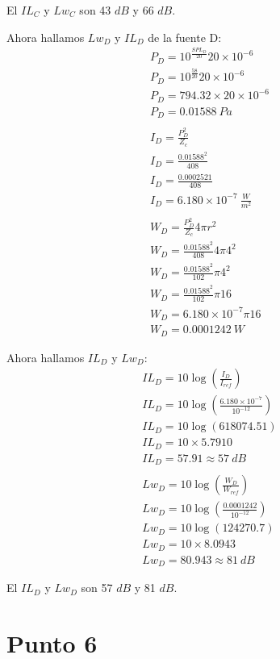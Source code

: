 \documentclass{article}
\begin{document}
El $IL_C$ y $Lw_C$ son 43 $dB$ y 66 $dB$.

Ahora hallamos $Lw_D$ y $IL_D$ de la fuente D:
\begin{gather*}
    P_D = 10^{\frac{SPL_D}{20}} 20 \times 10^{-6}\\
    P_D = 10^{\frac{58}{20}} 20 \times 10^{-6}\\
    P_D = 794.32 \times 20 \times 10^{-6}\\
    P_D = 0.01588\ Pa\\\\
    I_D = \frac{P_D^2}{Z_c}\\
    I_D = \frac{0.01588^2}{408}\\
    I_D = \frac{0.0002521}{408}\\
    I_D = 6.180 \times 10^{-7}\ \frac{W}{m^2}\\\\
    W_D = \frac{P_D^2}{Z_c} 4\pi r^2\\
    W_D = \frac{0.01588^2}{408} 4\pi 4^2\\
    W_D = \frac{0.01588^2}{102} \pi 4^2\\
    W_D = \frac{0.01588^2}{102} \pi 16\\
    W_D = 6.180 \times 10^{-7} \pi 16\\
    W_D = 0.0001242\ W
\end{gather*}

Ahora hallamos $IL_D$ y $Lw_D$:
\begin{gather*}
    IL_D = 10 \log(\frac{I_D}{I_{ref}})\\
    IL_D = 10 \log(\frac{6.180 \times 10^{-7}}{10^{-12}})\\
    IL_D = 10 \log(618074.51)\\
    IL_D = 10 \times 5.7910\\
    IL_D = 57.91 \approx 57\ dB\\\\
    Lw_D = 10 \log(\frac{W_D}{W_{ref}})\\
    Lw_D = 10 \log(\frac{0.0001242}{10^{-12}})\\
    Lw_D = 10 \log(124270.7)\\
    Lw_D = 10 \times 8.0943\\
    Lw_D = 80.943 \approx 81\ dB
\end{gather*}

El $IL_D$ y $Lw_D$ son 57 $dB$ y 81 $dB$.

\section{Punto 6}
\end{document}

